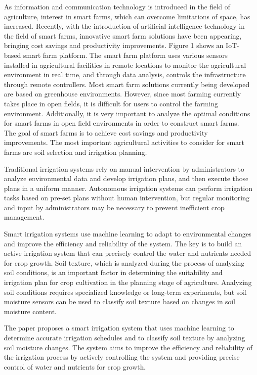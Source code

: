 \documentclass[11pt]{article}
\begin{document}
As information and communication technology is introduced in the field of agriculture, interest in smart farms, which can overcome limitations of space, has increased. Recently, with the introduction of artificial intelligence technology in the field of smart farms, innovative smart farm solutions have been appearing, bringing cost savings and productivity improvements. Figure 1 shows an IoT-based smart farm platform. The smart farm platform uses various sensors installed in agricultural facilities in remote locations to monitor the agricultural environment in real time, and through data analysis, controls the infrastructure through remote controllers. Most smart farm solutions currently being developed are based on greenhouse environments. However, since most farming currently takes place in open fields, it is difficult for users to control the farming environment. Additionally, it is very important to analyze the optimal conditions for smart farms in open field environments in order to construct smart farms. The goal of smart farms is to achieve cost savings and productivity improvements. The most important agricultural activities to consider for smart farms are soil selection and irrigation planning.

Traditional irrigation systems rely on manual intervention by administrators to analyze environmental data and develop irrigation plans, and then execute those plans in a uniform manner. Autonomous irrigation systems can perform irrigation tasks based on pre-set plans without human intervention, but regular monitoring and input by administrators may be necessary to prevent inefficient crop management.

Smart irrigation systems use machine learning to adapt to environmental changes and improve the efficiency and reliability of the system. The key is to build an active irrigation system that can precisely control the water and nutrients needed for crop growth. Soil texture, which is analyzed during the process of analyzing soil conditions, is an important factor in determining the suitability and irrigation plan for crop cultivation in the planning stage of agriculture. Analyzing soil conditions requires specialized knowledge or long-term experiments, but soil moisture sensors can be used to classify soil texture based on changes in soil moisture content.

The paper proposes a smart irrigation system that uses machine learning to determine accurate irrigation schedules and to classify soil texture by analyzing soil moisture changes. The system aims to improve the efficiency and reliability of the irrigation process by actively controlling the system and providing precise control of water and nutrients for crop growth.
\end{document}
